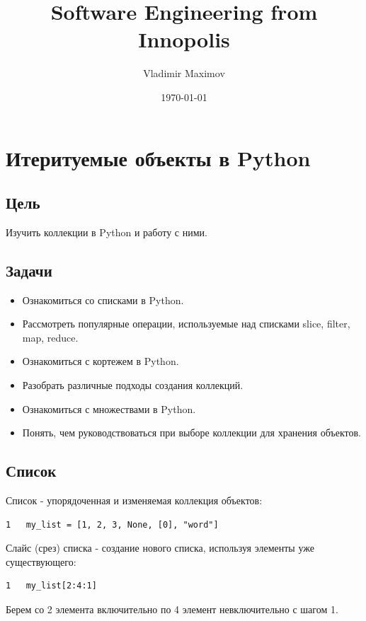 \documentclass[12pt, a4paper]{article}
\title{Software Engineering from Innopolis}
\author{Vladimir Maximov}
\date{\today}
\begin{document}
\maketitle

\section{Итеритуемые объекты в Python}

\subsection{Цель}

Изучить коллекции в Python и работу с ними.

\subsection{Задачи}

\begin{itemize}
    \item Ознакомиться со списками в Python.
    \item Рассмотреть популярные операции, используемые
    над списками slice, filter, map, reduce.
    \item Ознакомиться с кортежем в Python.
    \item Разобрать различные подходы создания коллекций.
    \item Ознакомиться с множествами в Python.
    \item Понять, чем руководствоваться при выборе 
    коллекции для хранения объектов.
\end{itemize}

\subsection{Список}

Список - упорядоченная и изменяемая коллекция объектов:

\begin{verbatim}
1   my_list = [1, 2, 3, None, [0], "word"]
\end{verbatim}

Слайс (срез) списка - создание нового списка, 
используя элементы уже существующего:

\begin{verbatim}
1   my_list[2:4:1]
\end{verbatim}

Берем со 2 элемента включительно по 4 элемент 
невключительно с шагом 1.
\end{document}
